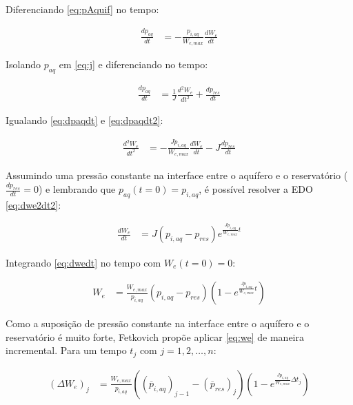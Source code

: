 \documentclass[final,5p]{elsarticle}
\numberwithin{equation}{section}
\begin{document}
        Diferenciando \ref{eq:pAquif} no tempo:

        \begin{align}
            \frac{dp_{aq}}{dt} &= - \frac{p_{i,aq}}{W_{e,max}} \frac{dW_e}{dt} \label{eq:dpaqdt}
        \end{align}

        Isolando $p_{aq}$ em \ref{eq:j} e diferenciando no tempo:

        \begin{align}
            \frac{dp_{aq}}{dt} &= \frac{1}{J} \frac{d^2W_e}{dt^2} + \frac{dp_{res}}{dt} \label{eq:dpaqdt2}
        \end{align}

        Igualando \ref{eq:dpaqdt} e \ref{eq:dpaqdt2}:

        \begin{align}
            \frac{d^2W_e}{dt^2} &= - \frac{J p_{i,aq}}{W_{e,max}} \frac{dW_e}{dt} - J \frac{dp_{res}}{dt} \label{eq:dwe2dt2}
        \end{align}

        Assumindo uma pressão constante na interface entre o aquífero e o reservatório ($\frac{dp_{res}}{dt} = 0$) e lembrando que $p_{aq}(t=0)=p_{i,aq}$, é possível resolver a EDO \ref{eq:dwe2dt2}:

        \begin{align}
            \frac{dW_e}{dt} &= J (p_{i,aq} - p_{res}) e^{\frac{J p_{i,aq}}{W_{e,max}} t} \label{eq:dwedt}
        \end{align}

        Integrando \ref{eq:dwedt} no tempo com $W_e(t=0)=0$:

        \begin{align}
            W_e &= \frac{W_{e,max}}{p_{i,aq}} (p_{i,aq} - p_{res}) \left( 1- e^{\frac{J p_{i,aq}}{W_{e,max}} t} \right) \label{eq:we}
        \end{align}

        Como a suposição de pressão constante na interface entre o aquífero e o reservatório é muito forte, Fetkovich propõe aplicar \ref{eq:we} de maneira incremental. Para um tempo $t_j$ com $j=1,2,\ldots,n$:

        \begin{align}
            (\Delta W_e)_j &= \frac{W_{e,max}}{p_{i,aq}} ((\overline{p}_{i,aq})_{j-1} - (\overline{p}_{res})_j) \left( 1- e^{\frac{J p_{i,aq}}{W_{e,max}} \Delta t_j} \right) \label{eq:deltawe}
        \end{align}
\end{document}
